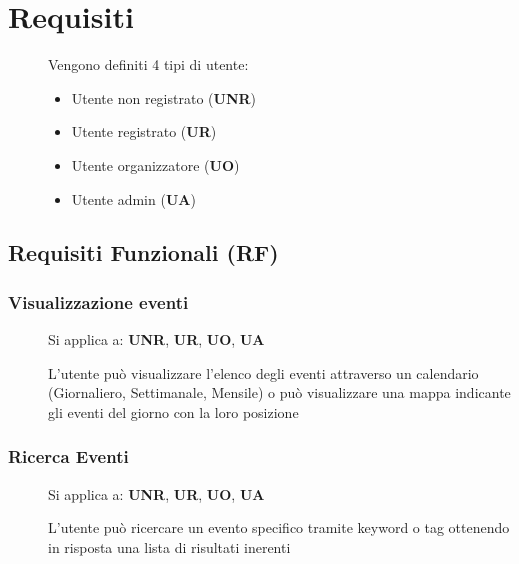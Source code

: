 \documentclass{article}
\begin{document}
\section{Requisiti}
\begin{description}
    \item[] Vengono definiti 4 tipi di utente:
        \begin{itemize}
            \item Utente non registrato (\textbf{UNR})
            \item Utente registrato (\textbf{UR})
            \item Utente organizzatore (\textbf{UO})
            \item Utente admin (\textbf{UA})
        \end{itemize}
\end{description}
\subsection{Requisiti Funzionali (RF)}
\renewcommand\thesubsubsection{RF\arabic{subsubsection}}
\subsubsection{Visualizzazione eventi} \label{rf_1}
\begin{description}
    \item[] Si applica a: \textbf{UNR}, \textbf{UR}, \textbf{UO}, \textbf{UA}
    \item[] L'utente può visualizzare l'elenco degli eventi attraverso un calendario (Giornaliero, Settimanale, Mensile) o può visualizzare una mappa indicante gli eventi del giorno con la loro posizione
\end{description}
\subsubsection{Ricerca Eventi} \label{rf_2}
\begin{description}
    \item[] Si applica a: \textbf{UNR}, \textbf{UR}, \textbf{UO}, \textbf{UA}
    \item[] L'utente può ricercare un evento specifico tramite keyword o tag ottenendo in risposta una lista di risultati inerenti
\end{description}
\end{document}
